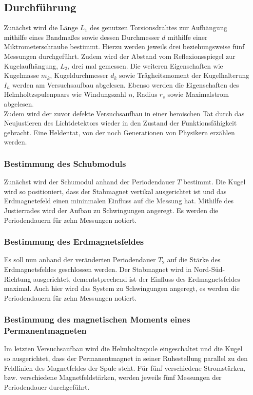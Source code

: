 \subsection{Durchführung}
Zunächst wird die Länge $L_1$ des genutzen Torsionsdrahtes zur Aufhängung mithilfe eines Bandmaßes sowie dessen Durchmesser $d$ mithilfe einer Miktrometerschraube bestimmt.
Hierzu werden jeweils drei beziehungsweise fünf Messungen durchgeführt.
Zudem wird der Abstand vom Reflexionsspiegel zur Kugelaufhängung, $L_2$, drei mal gemessen.
Die weiteren Eigenschaften wie Kugelmasse $m_k$, Kugeldurchmesser $d_k$ sowie Trägheitsmoment der Kugelhalterung $I_h$ werden am Versuchsaufbau abgelesen.
Ebenso werden die Eigenschaften des Helmholtzspulenpaars wie Windungszahl $n$, Radius $r_s$ sowie Maximalstrom abgelesen.\\
Zudem wird der zuvor defekte Versuchsaufbau in einer heroischen Tat durch das Neujustieren des Lichtdetektors wieder in den Zustand der Funktionsfähigkeit gebracht.
Eine Heldentat, von der noch Generationen von Physikern erzählen werden.\\
\subsubsection{Bestimmung des Schubmoduls}
\label{sec:d1}
Zunächst wird der Schumodul anhand der Periodendauer $T$ bestimmt.
Die Kugel wird so positioniert, dass der Stabmagnet vertikal ausgerichtet ist und das Erdmagnetefeld einen mininmalen Einfluss auf die Messung hat.
Mithilfe des Justierrades wird der Aufbau zu Schwingungen angeregt.
Es werden die Periodendauern für zehn Messungen notiert.
\subsubsection{Bestimmung des Erdmagnetsfeldes}
\label{sec:d2}
Es soll nun anhand der veränderten Periodendauer $T_2$ auf die Stärke des Erdmagnetsfeldes geschlossen werden.
Der Stabmagnet wird in Nord-Süd-Richtung ausgerichtet, dementstprechend ist der Einfluss des Erdmagnetsfeldes maximal.
Auch hier wird das System zu Schwingungen angeregt, es werden die Periodendauern für zehn Messungen notiert.
\subsubsection{Bestimmung des magnetischen Moments eines Permanentmagneten}
\label{sec:d3}
Im letzten Versuchsaufbau wird die Helmholtzspule eingeschaltet und die Kugel so ausgerichtet, dass der Permanentmagnet in seiner Ruhestellung parallel zu den Feldlinien des Magnetfeldes der Spule steht.
Für fünf verschiedene Stromstärken, bzw. verschiedene Magnetfeldstärken, werden jeweils fünf Messungen der Periodendauer durchgeführt.
